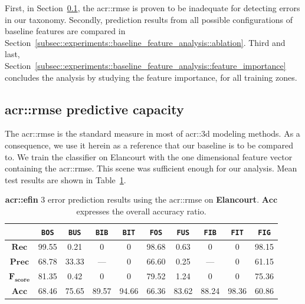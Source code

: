     First, in Section~\ref{subsec::experiments::baseline_feature_analysis::rmse}, the \gls{acr::rmse} is proven to be inadequate for detecting errors in our taxonomy.
    Secondly, prediction results from all possible configurations of baseline features are compared in Section~\ref{subsec::experiments::baseline_feature_analysis::ablation}.
    Third and last, Section~\ref{subsec::experiments::baseline_feature_analysis::feature_importance} concludes the analysis by studying the feature importance, for all training zones.

    \subsection{\texorpdfstring{\acrlong*{acr::rmse}}{RMSE} predictive capacity}
        \label{subsec::experiments::baseline_feature_analysis::rmse}
        The \gls{acr::rmse} is the standard measure in most of \gls{acr::3d} modeling methods.
        As a consequence, we use it herein as a reference that our baseline is to be compared to.
        We train the classifier on Elancourt with the one dimensional feature vector containing the \gls{acr::rmse}.
        This scene was sufficient enough for our analysis.
        Mean test results are shown in Table~\ref{tab::rmse_results}.\\

        \begin{table}[htpb]
            \footnotesize
            \begin{tabular}{c c c c c c c c c c}
                \toprule
                & \texttt{BOS} & \texttt{BUS} & \texttt{BIB} & \texttt{BIT} & \texttt{FOS} & \texttt{FUS} & \texttt{FIB} & \texttt{FIT} & \texttt{FIG} \\
                \midrule
                \(\bm{Rec}\) & 99.55 & 0.21 & 0 & 0 & 98.68 & 0.63 & 0 & 0 & 98.15 \\
                \midrule
                \(\bm{Prec}\) & 68.78 & 33.33 & --- & 0 & 66.60 & 0.25 & --- & 0 & 61.15 \\
                \midrule
                \(\bm{F_{score}}\) & 81.35 & 0.42 & 0 & 0 & 79.52 & 1.24 & 0 & 0 & 75.36 \\
                \midrule
                \(\bm{Acc}\) & 68.46 & 75.65 & 89.57 & 94.66 & 66.36 & 83.62 & 88.24 & 98.36 & 60.86 \\
                \bottomrule
            \end{tabular}
            \caption[
                \textbf{\gls{acr::efin}} 3 error prediction results using the \gls{acr::rmse} on \textbf{Elancourt}.
            ]{
                \label{tab::rmse_results}
                \textbf{\gls{acr::efin}} 3 error prediction results using the \gls{acr::rmse} on \textbf{Elancourt}.
                \(\bm{Acc}\) expresses the overall accuracy ratio.
            }
        \end{table}

